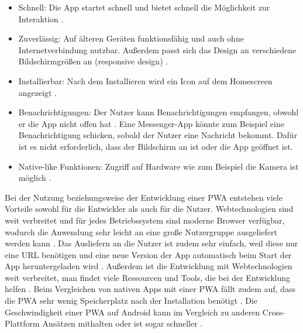 \begin{itemize}
  \item Schnell: Die App startet schnell und bietet schnell die Möglichkeit zur Interaktion \autocite{Hajian2019} \autocite{Sheppard2017}.
  \item Zuverlässig: Auf älteren Geräten funktionsfähig und auch ohne Internetverbindung nutzbar. Außerdem passt sich das Design an verschiedene Bildschirmgrößen an (responsive design) \autocite{Hajian2019} \autocite{Sheppard2017}.
  \item Installierbar: Nach dem Installieren wird ein Icon auf dem Homescreen angezeigt \autocite{Hajian2019} \autocite{Sheppard2017} \autocite{Rojas2020}.
  \item Benachrichtigungen: Der Nutzer kann Benachrichtigungen empfangen, obwohl er die App nicht offen hat \autocite{Hajian2019} \autocite{Sheppard2017}. Eine Messenger-App könnte zum Beispiel eine Benachrichtigung schicken, sobald der Nutzer eine Nachricht bekommt. Dafür ist es nicht erforderlich, dass der Bildschirm an ist oder die App geöffnet ist.
  \item Native-like Funktionen: Zugriff auf Hardware wie zum Beispiel die Kamera ist möglich \autocite{Hajian2019}.
\end{itemize}

Bei der Nutzung beziehungsweise der Entwicklung einer \ac{PWA} entstehen viele Vorteile sowohl für die Entwickler als auch für die Nutzer. Webtechnologien sind weit verbreitet und für jedes Betriebssystem sind moderne Browser verfügbar, wodurch die Anwendung sehr leicht an eine große Nutzergruppe ausgeliefert werden kann \autocite{Rojas2020}. Das Ausliefern an die Nutzer ist zudem sehr einfach, weil diese nur eine URL benötigen \autocite{KHAN2019289} und eine neue Version der App automatisch beim Start der App heruntergeladen wird \autocite{Rojas2020}. Außerdem ist die Entwicklung mit Webtechnologien weit verbreitet, man findet viele Ressourcen und Tools, die bei der Entwicklung helfen \autocite{Rojas2020}. Beim Vergleichen von nativen Apps mit einer \ac{PWA} fällt zudem auf, dass die \ac{PWA} sehr wenig Speicherplatz nach der Installation benötigt \autocite{biorn2017} \autocite{KHAN2019289}. Die Geschwindigkeit einer \ac{PWA} auf Android kann im Vergleich zu anderen Cross-Plattform Ansätzen mithalten oder ist sogar schneller \autocite{biorn2017}.

